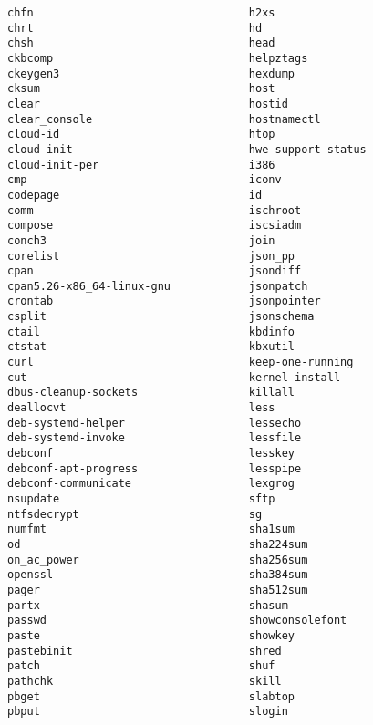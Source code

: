 \documentclass[10pt,a4paper,draft]{article}
\begin{document}
\begin{verbatim}
chfn                                 h2xs
chrt                                 hd
chsh                                 head
ckbcomp                              helpztags
ckeygen3                             hexdump
cksum                                host
clear                                hostid
clear_console                        hostnamectl
cloud-id                             htop
cloud-init                           hwe-support-status
cloud-init-per                       i386
cmp                                  iconv
codepage                             id
comm                                 ischroot
compose                              iscsiadm
conch3                               join
corelist                             json_pp
cpan                                 jsondiff
cpan5.26-x86_64-linux-gnu            jsonpatch
crontab                              jsonpointer
csplit                               jsonschema
ctail                                kbdinfo
ctstat                               kbxutil
curl                                 keep-one-running
cut                                  kernel-install
dbus-cleanup-sockets                 killall
deallocvt                            less
deb-systemd-helper                   lessecho
deb-systemd-invoke                   lessfile
debconf                              lesskey
debconf-apt-progress                 lesspipe
debconf-communicate                  lexgrog
nsupdate                             sftp
ntfsdecrypt                          sg
numfmt                               sha1sum
od                                   sha224sum
on_ac_power                          sha256sum
openssl                              sha384sum
pager                                sha512sum
partx                                shasum
passwd                               showconsolefont
paste                                showkey
pastebinit                           shred
patch                                shuf
pathchk                              skill
pbget                                slabtop
pbput                                slogin
\end{verbatim}
\end{document}
